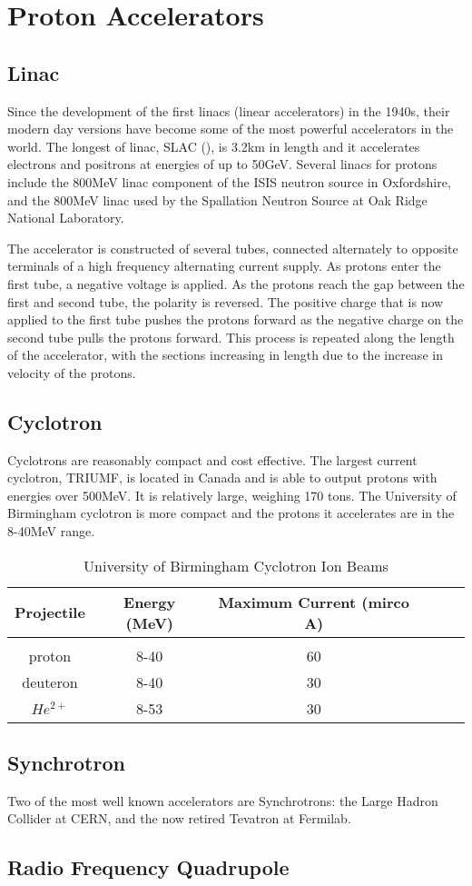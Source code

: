 \section{Proton Accelerators}

\subsection{Linac}

Since the development of the first linacs (linear accelerators) in the 1940s, their modern day versions have become some of the most powerful accelerators in the world.  The longest of linac, SLAC (), is 3.2km in length and it accelerates electrons and positrons at energies of up to 50GeV.  Several linacs for protons include the 800MeV linac component of the ISIS neutron source in Oxfordshire, and the 800MeV linac used by the Spallation Neutron Source at Oak Ridge National Laboratory.

The accelerator is constructed of several tubes, connected alternately to opposite terminals of a high frequency alternating current supply.  As protons enter the first tube, a negative voltage is applied.  As the protons reach the gap between the first and second tube, the polarity is reversed.  The positive charge that is now applied to the first tube pushes the protons forward as the negative charge on the second tube pulls the protons forward.  This process is repeated along the length of the accelerator, with the sections increasing in length due to the increase in velocity of the protons.

\subsection{Cyclotron}

Cyclotrons are reasonably compact and cost effective.  The largest current cyclotron, TRIUMF, is located in Canada and is able to output protons with energies over 500MeV.  It is relatively large, weighing 170 tons.  The University of Birmingham cyclotron is more compact and the protons it accelerates are in the 8-40MeV range.


\begin{table}[h]
\begin{center}
\begin{tabular}{c c c c c c}
Projectile & Energy (MeV) & Maximum Current (mirco A) \\
\hline \\
proton & 8-40 & 60 \\
deuteron & 8-40 & 30 \\
$He^{2+}$ & 8-53 & 30 \\
\end{tabular}
\end{center}
\caption{University of Birmingham Cyclotron Ion Beams}
\end{table}


\subsection{Synchrotron}

Two of the most well known accelerators are Synchrotrons: the Large Hadron Collider at CERN, and the now retired Tevatron at Fermilab.  


\subsection{Radio Frequency Quadrupole}
